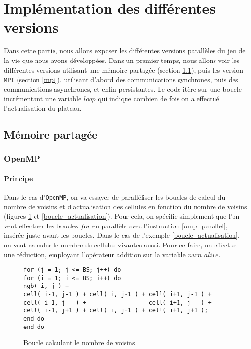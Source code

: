 \section{Implémentation des différentes versions} %
\label{sec:diff_rents_versions}
Dans cette partie, nous allons exposer les différentes versions parallèles du jeu de la vie que nous avons développées. Dans un premier temps, nous allons voir les différentes versions utilisant une mémoire partagée (section \ref{partagee}), puis les version \texttt{MPI} (section \ref{mpi}), utilisant d'abord des communications synchrones, puis des communications asynchrones, et enfin persistantes. Le code itère sur une boucle incrémentant une variable $loop$ qui indique combien de fois on a effectué l'actualisation du plateau. 

\subsection{Mémoire partagée}
\label{partagee}

\subsubsection{OpenMP}
\label{openmp}
\paragraph{Principe}
Dans le cas d'\texttt{OpenMP}, on va essayer de paralléliser les boucles de calcul du nombre de voisins et d'actualisation des cellules en fonction du nombre de voisins (figures \ref{boucle_voisins} et \ref{boucle_actualisation}). Pour cela, on spécifie simplement que l'on veut effectuer les boucles $for$ en parallèle avec l'instruction \ref{omp_parallel}, insérée juste avant les boucles. Dans le cas de l'exemple \ref{boucle_actualisation}, on veut calculer le nombre de cellules vivantes aussi. Pour ce faire, on effectue une réduction, employant l'opérateur addition sur la variable $num\_alive$. 

\begin{figure}[!ht]
\begin{lstlisting}
for (j = 1; j <= BS; j++) do
for (i = 1; i <= BS; i++) do
ngb( i, j ) =
cell( i-1, j-1 ) + cell( i, j-1 ) + cell( i+1, j-1 ) +
cell( i-1, j   ) +                  cell( i+1, j   ) +
cell( i-1, j+1 ) + cell( i, j+1 ) + cell( i+1, j+1 );
end do
end do
\end{lstlisting}
\caption{Boucle calculant le nombre de voisins}
\label{boucle_voisins}
\end{figure}


